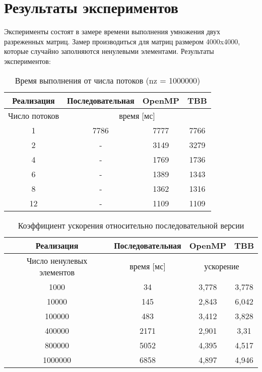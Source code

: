 \documentclass{report}
\begin{document}
\section*{Результаты экспериментов}
\par Эксперименты состоят в замере времени выполнения умножения двух разреженных матриц. Замер производиться для матриц размером 4000x4000, которые случайно заполняются ненулевыми элементами. Результаты экспериментов:
\begin{table}[htbp]
	\centering
	\begin{tabular}{|c|c|c|c|} \hline
		Реализация & Последовательная & OpenMP & TBB\\ \hline
		Число потоков & \multicolumn{3}{|c|}{время [мс]} \\ \hline
		1 & 7786 & 7777 & 7766 \\ \hline
		2 & - & 3149 & 3279 \\ \hline
		4 & - & 1769 & 1736 \\ \hline
		6 & - & 1389 & 1343 \\ \hline
		8 & - & 1362 & 1316 \\ \hline
		12 & - & 1109 & 1109 \\ \hline
	\end{tabular}
	\caption{Время выполнения от числа потоков (nz = 1000000)}
\end{table}

\begin{table}[htbp]
	\centering
	\begin{tabular}{|c|c|c|c|} \hline
		Реализация & Последовательная & OpenMP & TBB\\ \hline
		Число ненулевых элементов & время [мс] & \multicolumn{2}{|c|}{ускорение} \\ \hline
		1000 & 34 & 3,778 & 3,778 \\ \hline
		10000 & 145 & 2,843 & 6,042 \\ \hline
		100000 & 483 & 3,412 & 3,828 \\ \hline
		400000 & 2171 & 2,901 & 3,31 \\ \hline
		800000 & 5052 & 4,395 & 4,517 \\ \hline
		1000000 & 6858 & 4,897 & 4,946 \\ \hline
	\end{tabular}
	\caption{Коэффициент ускорения относительно последовательной версии}
\end{table}
\newpage
\end{document}
